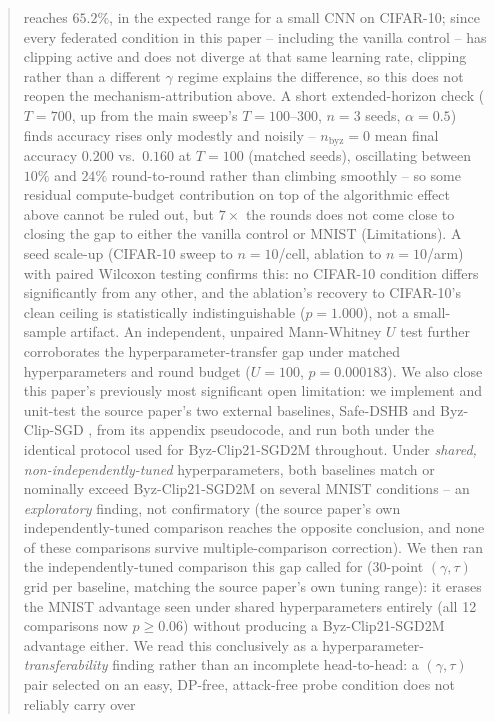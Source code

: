 \documentclass{article}
\begin{document}
\begin{abstract}
reaches $65.2\%$, in the expected range for a small CNN on CIFAR-10;
since every federated condition in this paper -- including the vanilla
control -- has clipping active and does not diverge at that same learning
rate, clipping rather than a different $\gamma$ regime explains the
difference, so this does not reopen the mechanism-attribution above. A short
extended-horizon check ($T{=}700$, up from the main sweep's $T{=}100$--$300$,
$n{=}3$ seeds, $\alpha{=}0.5$) finds accuracy rises only modestly and
noisily -- $n_{\text{byz}}{=}0$ mean final accuracy $0.200$ vs.\ $0.160$ at
$T{=}100$ (matched seeds), oscillating between $10\%$ and $24\%$ round-to-round
rather than climbing smoothly -- so some residual compute-budget contribution
on top of the algorithmic effect above cannot be ruled out, but $7\times$ the
rounds does not come close to closing the gap to either the vanilla control or
MNIST (Limitations). A seed scale-up (CIFAR-10 sweep to
$n{=}10$/cell, ablation to $n{=}10$/arm) with paired Wilcoxon testing confirms
this: no CIFAR-10 condition differs significantly from any other, and the
ablation's recovery to CIFAR-10's clean ceiling is statistically
indistinguishable ($p{=}1.000$), not a small-sample artifact. An independent,
unpaired Mann-Whitney $U$ test further corroborates the hyperparameter-transfer
gap under matched hyperparameters and round budget ($U{=}100$,
$p{=}0.000183$). We also close this paper's previously most significant open
limitation: we implement and unit-test the source paper's two external
baselines, Safe-DSHB \citep{allouah2023trilemma} and Byz-Clip-SGD
\citep{islamov2026byzclip}, from its appendix pseudocode, and run both under
the identical protocol used for Byz-Clip21-SGD2M throughout. Under
\emph{shared, non-independently-tuned} hyperparameters, both baselines match
or nominally exceed Byz-Clip21-SGD2M on several MNIST conditions -- an
\emph{exploratory} finding, not confirmatory (the source paper's own
independently-tuned comparison reaches the opposite conclusion, and none of
these comparisons survive multiple-comparison correction). We then ran the
independently-tuned comparison this gap called for (30-point $(\gamma,\tau)$
grid per baseline, matching the source paper's own tuning range): it erases
the MNIST advantage seen under shared hyperparameters entirely (all 12
comparisons now $p\geq0.06$) without producing a Byz-Clip21-SGD2M advantage
either. We read this conclusively as a hyperparameter-\emph{transferability}
finding rather than an incomplete head-to-head: a $(\gamma,\tau)$ pair selected
on an easy, DP-free, attack-free probe condition does not reliably carry over

\end{abstract}
\end{document}

